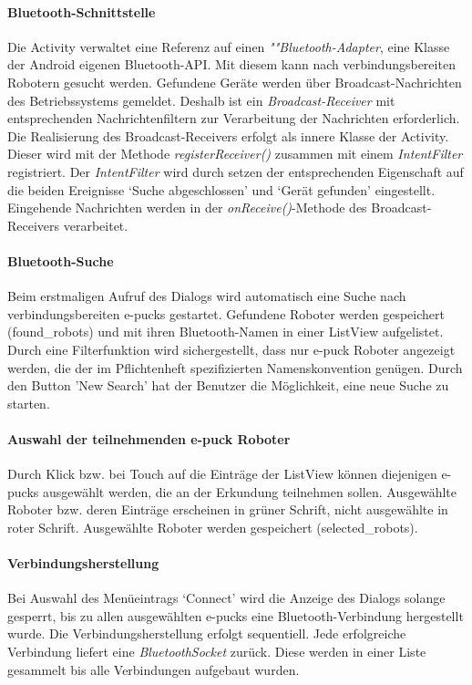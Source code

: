 \documentclass[10pt,a4paper]{article}
\begin{document}
	\paragraph*{Bluetooth-Schnittstelle} Die Activity verwaltet eine Referenz auf einen \textit{""Blue\-tooth-A\-dap\-ter}, eine Klasse der Android
	eigenen Bluetooth-API. Mit diesem kann nach verbindungsbereiten Robotern gesucht werden. Gefundene Geräte werden über Broadcast-Nachrichten des
	Betriebssystems gemeldet. Deshalb ist ein \textit{Broadcast-Receiver} mit entsprechenden Nachrichtenfiltern zur Verarbeitung der Nachrichten
	erforderlich.
	Die Realisierung des Broadcast-Receivers erfolgt als innere Klasse der Activity. Dieser wird mit der Methode \textit{registerReceiver()} zusammen
	mit einem \textit{IntentFilter} registriert.
	Der \textit{IntentFilter} wird durch setzen der entsprechenden Eigenschaft auf die beiden Ereignisse `Suche abgeschlossen' und `Gerät gefunden'
	eingestellt. Eingehende Nachrichten werden in der \textit{onReceive()}-Methode des Broadcast-Receivers verarbeitet.
	
	\paragraph*{Bluetooth-Suche} Beim erstmaligen Aufruf des Dialogs wird automatisch eine Suche nach verbindungsbereiten e-pucks gestartet. 
	Gefundene Roboter werden gespeichert (found\_robots) und mit ihren Bluetooth-Namen in einer ListView aufgelistet. Durch eine 
	Filterfunktion wird sichergestellt, dass nur e-puck Roboter angezeigt werden, die der im Pflichtenheft spezifizierten Namenskonvention genügen.
	Durch den Button 'New Search' hat der Benutzer die Möglichkeit, eine neue Suche zu starten. 
	
	\paragraph*{Auswahl der teilnehmenden e-puck Roboter} Durch Klick bzw. bei Touch auf die Einträge der ListView können diejenigen e-pucks
	ausgewählt werden, die an der Erkundung teilnehmen sollen. Ausgewählte Roboter bzw. deren Einträge erscheinen in grüner Schrift, nicht
	ausgewählte in roter Schrift. Ausgewählte Roboter werden gespeichert (selected\_robots).
	
	\paragraph*{Verbindungsherstellung}
	Bei Auswahl des Menüeintrags `Connect' wird die Anzeige des Dialogs solange gesperrt, bis zu allen ausgewählten e-pucks eine Bluetooth-Verbindung
	hergestellt wurde. Die Verbindungsherstellung erfolgt sequentiell. Jede erfolgreiche Verbindung liefert eine \textit{BluetoothSocket} zurück.
	Diese werden in einer Liste gesammelt bis alle Verbindungen aufgebaut wurden.
	
\end{document}
